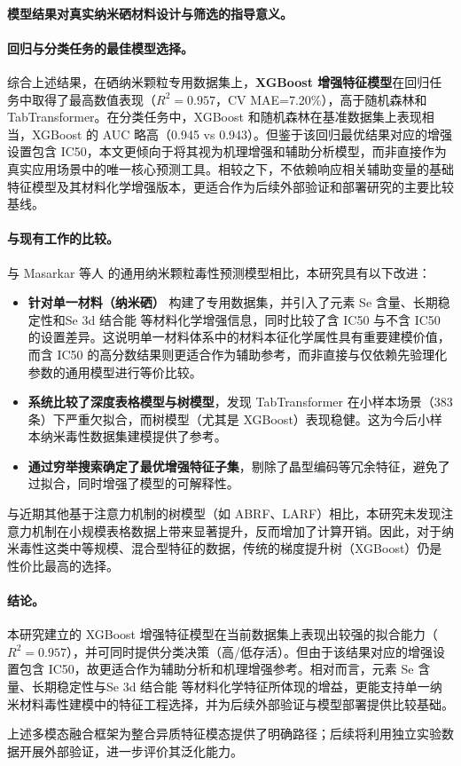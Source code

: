 \paragraph{模型结果对真实纳米硒材料设计与筛选的指导意义。}

\paragraph{回归与分类任务的最佳模型选择。}
综合上述结果，在硒纳米颗粒专用数据集上，\textbf{XGBoost 增强特征模型}在回归任务中取得了最高数值表现（$R^2=0.957$，CV MAE=7.20\%），高于随机森林和 TabTransformer。在分类任务中，XGBoost 和随机森林在基准数据集上表现相当，XGBoost 的 AUC 略高（0.945 vs 0.943）。但鉴于该回归最优结果对应的增强设置包含 IC50，本文更倾向于将其视为机理增强和辅助分析模型，而非直接作为真实应用场景中的唯一核心预测工具。相较之下，不依赖响应相关辅助变量的基础特征模型及其材料化学增强版本，更适合作为后续外部验证和部署研究的主要比较基线。

\paragraph{与现有工作的比较。}
与 Masarkar 等人 \cite{masarkar2024} 的通用纳米颗粒毒性预测模型相比，本研究具有以下改进：
\begin{itemize}
  \item \textbf{针对单一材料（纳米硒）} 构建了专用数据集，并引入了元素 Se 含量、长期稳定性和Se 3d 结合能 等材料化学增强信息，同时比较了含 IC50 与不含 IC50 的设置差异。这说明单一材料体系中的材料本征化学属性具有重要建模价值，而含 IC50 的高分数结果则更适合作为辅助参考，而非直接与仅依赖先验理化参数的通用模型进行等价比较。
  \item \textbf{系统比较了深度表格模型与树模型}，发现 TabTransformer 在小样本场景（383 条）下严重欠拟合，而树模型（尤其是 XGBoost）表现稳健。这为今后小样本纳米毒性数据集建模提供了参考。
  \item \textbf{通过穷举搜索确定了最优增强特征子集}，剔除了晶型编码等冗余特征，避免了过拟合，同时增强了模型的可解释性。
\end{itemize}
与近期其他基于注意力机制的树模型（如 ABRF、LARF）相比，本研究未发现注意力机制在小规模表格数据上带来显著提升，反而增加了计算开销。因此，对于纳米毒性这类中等规模、混合型特征的数据，传统的梯度提升树（XGBoost）仍是性价比最高的选择。

\paragraph{结论。}
本研究建立的 XGBoost 增强特征模型在当前数据集上表现出较强的拟合能力（$R^2=0.957$），并可同时提供分类决策（高/低存活）。但由于该结果对应的增强设置包含 IC50，故更适合作为辅助分析和机理增强参考。相对而言，元素 Se 含量、长期稳定性与Se 3d 结合能 等材料化学特征所体现的增益，更能支持单一纳米材料毒性建模中的特征工程选择，并为后续外部验证与模型部署提供比较基础。

上述多模态融合框架为整合异质特征模态提供了明确路径；后续将利用独立实验数据开展外部验证，进一步评价其泛化能力。
